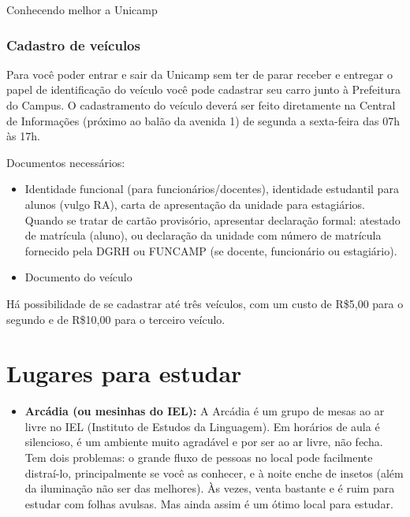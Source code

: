 \begin{story}{Conhecendo melhor a Unicamp}
\subsubsection*{Cadastro de veículos}

Para você poder entrar e sair da Unicamp sem ter de parar receber e entregar o papel de identificação do veículo você pode cadastrar seu carro junto à Prefeitura do Campus. O cadastramento do veículo deverá ser feito diretamente na Central de Informações (próximo ao balão da avenida 1) de segunda a sexta-feira das 07h às 17h.

Documentos necessários:

\begin{itemize}
\item Identidade funcional (para funcionários/docentes), identidade estudantil para alunos (vulgo RA), carta de apresentação da unidade para estagiários. Quando se tratar de cartão provisório, apresentar declaração formal: atestado de matrícula (aluno), ou declaração da unidade com número de matrícula fornecido pela DGRH ou FUNCAMP (se docente, funcionário ou estagiário).
\item Documento do veículo
\end{itemize}

Há possibilidade de se cadastrar até três veículos, com um custo de R\$5,00 para o segundo e de R\$10,00 para o terceiro veículo.

\section*{Lugares para estudar}

\begin{itemize}

\item \textbf{Arcádia (ou mesinhas do IEL):} A Arcádia é um grupo de mesas ao ar livre no IEL (Instituto de Estudos da Linguagem). Em horários de aula é silencioso, é um ambiente muito agradável e por ser ao ar livre, não fecha. Tem dois problemas: o grande fluxo de pessoas no local pode facilmente distraí-lo, principalmente se você as conhecer, e à noite enche de insetos (além da iluminação não ser das melhores). Às vezes, venta bastante e é ruim para estudar com folhas avulsas. Mas ainda assim é um ótimo local para estudar.


\end{itemize}
\end{story}
